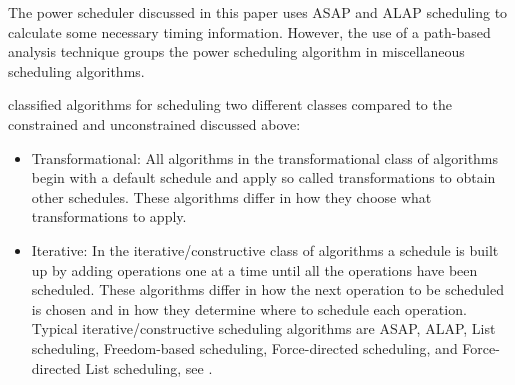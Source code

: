 \documentclass[conference]{IEEEtran}
\begin{document}
The power scheduler discussed in this paper uses ASAP and ALAP scheduling to calculate some necessary timing information. However, the use of a path-based analysis technique groups the power scheduling algorithm in miscellaneous scheduling algorithms.  

\cite{52214} classified algorithms for scheduling two different classes compared to the constrained and unconstrained discussed above: 
\begin{itemize}
    \item Transformational: All algorithms in the transformational class of algorithms begin with a default schedule and apply so called transformations to obtain other schedules. These algorithms differ in how they choose what transformations to apply.
    \item Iterative:  In the iterative/constructive class of algorithms a schedule is built up by adding operations one at a time until all the operations have been scheduled. These algorithms differ in how the next operation to be scheduled is chosen and in how they determine where to schedule each operation. Typical iterative/constructive scheduling algorithms are ASAP, ALAP, List scheduling, Freedom-based scheduling, Force-directed scheduling, and Force-directed List scheduling, see \cite{german97}.
\end{itemize}



\end{document}
